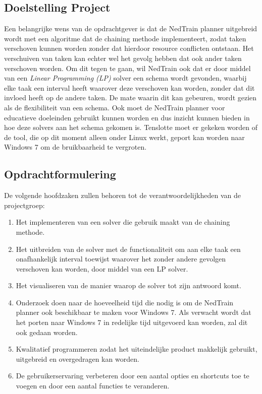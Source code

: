 \subsection{Doelstelling Project}
Een belangrijke wens van de opdrachtgever is dat de NedTrain planner uitgebreid wordt met een algoritme dat de chaining methode implementeert, zodat taken verschoven kunnen worden zonder dat hierdoor resource conflicten ontstaan. \cite{seminarium2014} Het verschuiven van taken kan echter wel het gevolg hebben dat ook ander taken verschoven worden. Om dit tegen te gaan, wil NedTrain ook dat er door middel van een \emph{Linear Programming (LP)} solver een schema wordt gevonden, waarbij elke taak een interval heeft waarover deze verschoven kan worden, zonder dat dit invloed heeft op de andere taken. De mate waarin dit kan gebeuren, wordt gezien als de flexibiliteit van een schema. Ook moet de NedTrain planner voor educatieve doeleinden gebruikt kunnen worden en dus inzicht kunnen bieden in hoe deze solvers aan het schema gekomen is. Tenslotte moet er gekeken worden of de tool, die op dit moment alleen onder Linux werkt, geport kan worden naar Windows 7 om de bruikbaarheid te vergroten.

\newpage

\subsection{Opdrachtformulering}
\label{subsec:opdrachtformulering}
De volgende hoofdzaken zullen behoren tot de verantwoordelijkheden van de projectgroep:
\begin{enumerate}
	\item \label{enum:chaining} Het implementeren van een solver die gebruik maakt van de chaining methode.
	\item \label{enum:LP} Het uitbreiden van de solver met de functionaliteit om aan elke taak een onafhankelijk interval toewijst waarover het zonder andere gevolgen verschoven kan worden, door middel van een LP solver.
	\item \label{enum:visueel} Het visualiseren van de manier waarop de solver tot zijn antwoord komt.
	\item \label{enum:windows} Onderzoek doen naar de hoeveelheid tijd die nodig is om de NedTrain planner ook beschikbaar te maken voor Windows 7. Als verwacht wordt dat het porten naar Windows 7 in redelijke tijd uitgevoerd kan worden, zal dit ook gedaan worden. 
	\item \label{enum:kwaliteit} Kwalitatief programmeren zodat het uiteindelijke product makkelijk gebruikt, uitgebreid en overgedragen kan worden.
	\item \label{enum:gebruiker} De gebruikerservaring verbeteren door een aantal opties en shortcuts toe te voegen en door een aantal functies te veranderen.
\end{enumerate}

